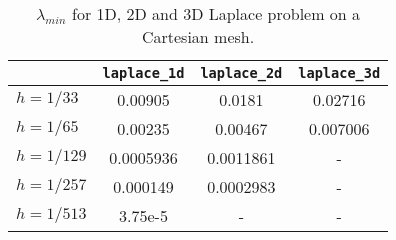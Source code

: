 \begin{table}[htbp]
  \centering
  \begin{tabular}{| l | c c c |}    
    \hline
& {\tt laplace\_1d} & {\tt laplace\_2d} &{\tt laplace\_3d} \\
     \hline
     $h = 1/33$ & 0.00905 & 0.0181 & 0.02716 \\
     $h = 1/65$ & 0.00235  & 0.00467 & 0.007006 \\
     $h = 1/129$ & 0.0005936 & 0.0011861 & - \\
     $h = 1/257$ & 0.000149 & 0.0002983 & - \\
     $h = 1/513$ & 3.75e-5 & - & - \\
     \hline
  \end{tabular}
  \caption{$\lambda_{min}$ for 1D, 2D and 3D Laplace problem on a Cartesian mesh.}
  \label{tab:anasazi:Lapl}
\end{table}





